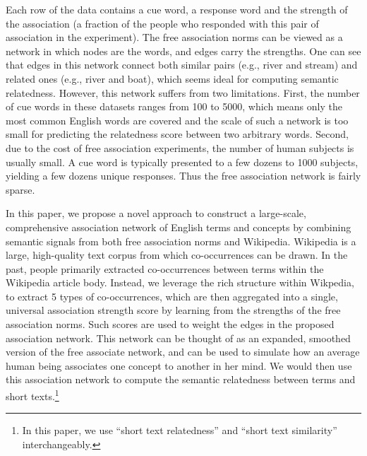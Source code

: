 Each row of the data contains a cue word, a response word and the
strength of the association (a fraction of the people who
responded with this pair of association in the experiment). 
The free association norms can be viewed as a network in which 
nodes are the words, and edges carry the strengths.
One can see that edges in this network connect both similar pairs
(e.g., river and stream) and related ones (e.g., river and boat), which
seems ideal for computing semantic relatedness. However, this network suffers from two limitations. First, the
number of cue words in these datasets ranges from 100 to 5000, 
which means only the most
common English words are covered and the scale of such a network is
too small for predicting the relatedness score between two arbitrary
words. Second, due to the cost of free association experiments, the
number of human subjects is usually small. A cue word is 
typically presented to a few dozens to 1000 subjects, yielding a few dozens
unique responses. 
Thus the free association network is fairly sparse.

In this paper, we propose a novel approach to construct a large-scale,
comprehensive association network of English terms and concepts by
combining semantic signals
from both free association norms and Wikipedia.
Wikipedia is a large, high-quality text corpus from which
co-occurrences can be drawn. In the past, people primarily extracted
co-occurrences between terms within the Wikipedia article body.
Instead, we leverage the rich structure within Wikpedia, to
extract 5 types of co-occurrences, which are then
aggregated into a single, universal association strength score by
learning from the strengths of the free association norms. Such
scores are used to weight the edges in the proposed association
network. This network can be thought of as an expanded, smoothed
version of the free associate network, and can be used to simulate how
an average human being associates one concept to another in her
mind. We would then use this association network to compute the
semantic relatedness between terms and short texts.\footnote{In this paper,
we use ``short text relatedness'' and ``short text similarity'' interchangeably.}

